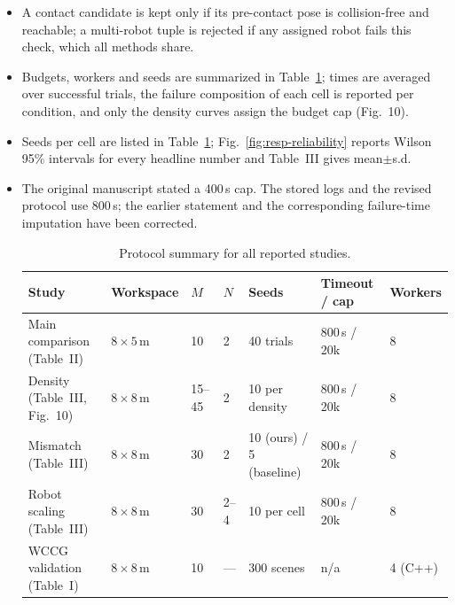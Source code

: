 \documentclass[11pt]{article}
\begin{document}
\begin{itemize}
\item A contact candidate is kept only if its pre-contact pose is collision-free and reachable; a
multi-robot tuple is rejected if any assigned robot fails this check, which all methods share.
\item Budgets, workers and seeds are summarized in Table~\ref{tab:protocol}; times are averaged over successful
trials, the failure composition of each cell is reported per condition, and only the density
curves assign the budget cap (Fig.~10).
\item Seeds per cell are listed in Table~\ref{tab:protocol}; Fig.~\ref{fig:resp-reliability} reports Wilson 95\% intervals for
every headline number and Table~III gives mean$\pm$s.d.
\item The original manuscript stated a 400\,s cap. The stored logs and the
revised protocol use 800\,s; the earlier statement and the corresponding
failure-time imputation have been corrected.

\begin{table}[!ht]
\centering
\begin{threeparttable}
\footnotesize
\caption{Protocol summary for all reported studies.}
\label{tab:protocol}
\setlength{\tabcolsep}{3.4pt}
\begin{tabular}{lllllll}
\toprule
Study & Workspace & $M$ & $N$ & Seeds & Timeout / cap & Workers\\
\midrule
Main comparison (Table~II) & $8{\times}5$\,m & 10 & 2 & 40 trials & 800\,s / 20k & 8\\
Density (Table~III, Fig.~10) & $8{\times}8$\,m & 15--45 & 2 & 10 per density & 800\,s / 20k & 8\\
Mismatch (Table~III) & $8{\times}8$\,m & 30 & 2 & 10 (ours) / 5 (baseline) & 800\,s / 20k & 8\\
Robot scaling (Table~III) & $8{\times}8$\,m & 30 & 2--4 & 10 per cell & 800\,s / 20k & 8\\
WCCG validation (Table~I) & $8{\times}8$\,m & 10 & --- & 300 scenes & n/a & 4 (C++)\\
\bottomrule
\end{tabular}
\end{threeparttable}
\vspace{-4mm}
\end{table}


\end{itemize}
\end{document}
